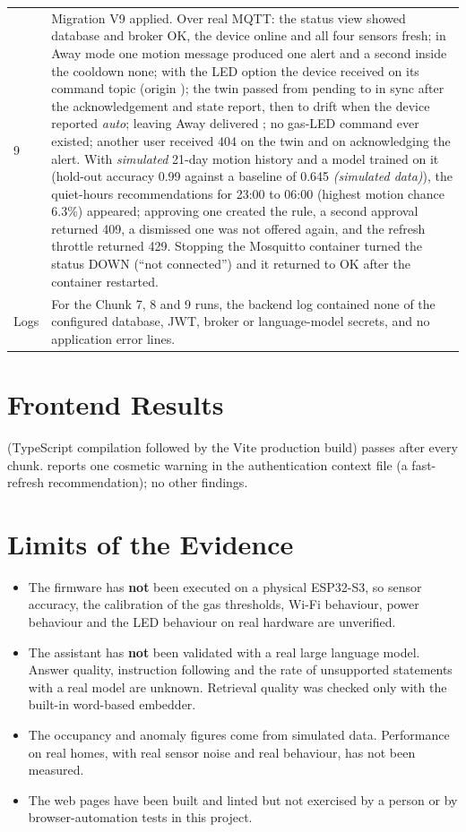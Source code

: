 \documentclass[12pt,a4paper,oneside]{report}
\newcommand{\code}[1]{\texttt{\detokenize{#1}}}
\newcommand{\simulated}{\textit{(simulated data)}}
\begin{document}
\begin{longtable}{@{}p{2.3cm}p{12.3cm}@{}}
9 & Migration V9 applied. Over real MQTT: the status view showed database and broker OK, the device online and all four sensors fresh; in Away mode one motion message produced one alert and a second inside the cooldown none; with the LED option the device received \code{set_pir_led on} on its command topic (origin \code{security:away}); the twin passed from pending to in sync after the acknowledgement and state report, then to drift when the device reported \emph{auto}; leaving Away delivered \code{set_pir_led auto}; no gas-LED command ever existed; another user received 404 on the twin and on acknowledging the alert. With \emph{simulated} 21-day motion history and a model trained on it (hold-out accuracy 0.99 against a baseline of 0.645 \simulated), the quiet-hours recommendations for 23:00 to 06:00 (highest motion chance 6.3\%) appeared; approving one created the rule, a second approval returned 409, a dismissed one was not offered again, and the refresh throttle returned 429. Stopping the Mosquitto container turned the status DOWN (``not connected'') and it returned to OK after the container restarted.\\
Logs & For the Chunk 7, 8 and 9 runs, the backend log contained none of the configured database, JWT, broker or language-model secrets, and no application error lines.\\
\bottomrule
\end{longtable}

\section{Frontend Results}
\code{npm run build} (TypeScript compilation followed by the Vite production build) passes after every chunk. \code{npm run lint} reports one cosmetic warning in the authentication context file (a fast-refresh recommendation); no other findings.

\section{Limits of the Evidence}
\begin{itemize}
  \item The firmware has \textbf{not} been executed on a physical ESP32-S3, so sensor accuracy, the calibration of the gas thresholds, Wi-Fi behaviour, power behaviour and the LED behaviour on real hardware are unverified.
  \item The assistant has \textbf{not} been validated with a real large language model. Answer quality, instruction following and the rate of unsupported statements with a real model are unknown. Retrieval quality was checked only with the built-in word-based embedder.
  \item The occupancy and anomaly figures come from simulated data. Performance on real homes, with real sensor noise and real behaviour, has not been measured.
  \item The web pages have been built and linted but not exercised by a person or by browser-automation tests in this project.
\end{itemize}
\end{document}
